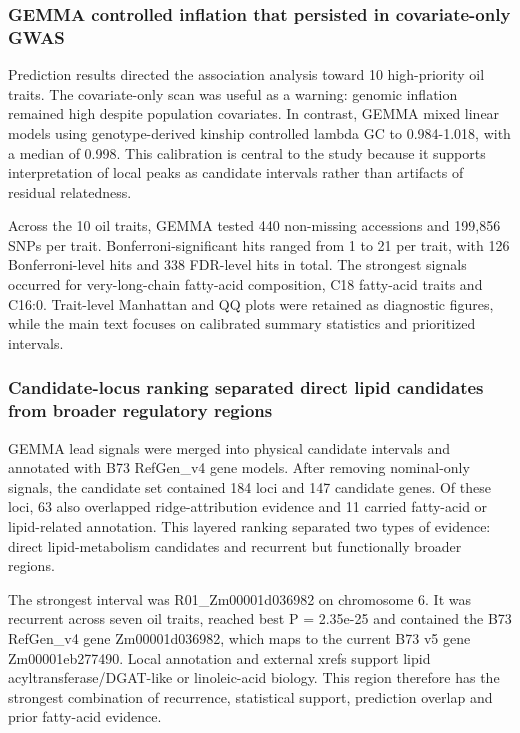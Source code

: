 \documentclass[
]{article}
\begin{document}
\subsubsection{GEMMA controlled inflation that persisted in
covariate-only
GWAS}\label{gemma-controlled-inflation-that-persisted-in-covariate-only-gwas}

Prediction results directed the association analysis toward 10
high-priority oil traits. The covariate-only scan was useful as a
warning: genomic inflation remained high despite population covariates.
In contrast, GEMMA mixed linear models using genotype-derived kinship
controlled lambda GC to 0.984-1.018, with a median of 0.998. This
calibration is central to the study because it supports interpretation
of local peaks as candidate intervals rather than artifacts of residual
relatedness.

Across the 10 oil traits, GEMMA tested 440 non-missing accessions and
199,856 SNPs per trait. Bonferroni-significant hits ranged from 1 to 21
per trait, with 126 Bonferroni-level hits and 338 FDR-level hits in
total. The strongest signals occurred for very-long-chain fatty-acid
composition, C18 fatty-acid traits and C16:0. Trait-level Manhattan and
QQ plots were retained as diagnostic figures, while the main text
focuses on calibrated summary statistics and prioritized intervals.

\subsubsection{Candidate-locus ranking separated direct lipid candidates
from broader regulatory
regions}\label{candidate-locus-ranking-separated-direct-lipid-candidates-from-broader-regulatory-regions}

GEMMA lead signals were merged into physical candidate intervals and
annotated with B73 RefGen\_v4 gene models. After removing nominal-only
signals, the candidate set contained 184 loci and 147 candidate genes.
Of these loci, 63 also overlapped ridge-attribution evidence and 11
carried fatty-acid or lipid-related annotation. This layered ranking
separated two types of evidence: direct lipid-metabolism candidates and
recurrent but functionally broader regions.

The strongest interval was R01\_Zm00001d036982 on chromosome 6. It was
recurrent across seven oil traits, reached best P = 2.35e-25 and
contained the B73 RefGen\_v4 gene Zm00001d036982, which maps to the
current B73 v5 gene Zm00001eb277490. Local annotation and external xrefs
support lipid acyltransferase/DGAT-like or linoleic-acid biology. This
region therefore has the strongest combination of recurrence,
statistical support, prediction overlap and prior fatty-acid evidence.
\end{document}
